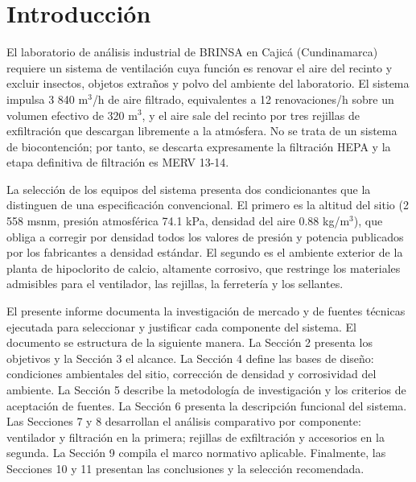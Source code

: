 \section{Introducción}

El laboratorio de análisis industrial de BRINSA en Cajicá (Cundinamarca) requiere un sistema de ventilación cuya función es renovar el aire del recinto y excluir insectos, objetos extraños y polvo del ambiente del laboratorio. El sistema impulsa 3 840 m$^3$/h de aire filtrado, equivalentes a 12 renovaciones/h sobre un volumen efectivo de 320 m$^3$, y el aire sale del recinto por tres rejillas de exfiltración que descargan libremente a la atmósfera. No se trata de un sistema de biocontención; por tanto, se descarta expresamente la filtración HEPA y la etapa definitiva de filtración es MERV 13-14.

La selección de los equipos del sistema presenta dos condicionantes que la distinguen de una especificación convencional. El primero es la altitud del sitio (2 558 msnm, presión atmosférica 74.1 kPa, densidad del aire 0.88 kg/m$^3$), que obliga a corregir por densidad todos los valores de presión y potencia publicados por los fabricantes a densidad estándar. El segundo es el ambiente exterior de la planta de hipoclorito de calcio, altamente corrosivo, que restringe los materiales admisibles para el ventilador, las rejillas, la ferretería y los sellantes.

El presente informe documenta la investigación de mercado y de fuentes técnicas ejecutada para seleccionar y justificar cada componente del sistema. El documento se estructura de la siguiente manera. La Sección 2 presenta los objetivos y la Sección 3 el alcance. La Sección 4 define las bases de diseño: condiciones ambientales del sitio, corrección de densidad y corrosividad del ambiente. La Sección 5 describe la metodología de investigación y los criterios de aceptación de fuentes. La Sección 6 presenta la descripción funcional del sistema. Las Secciones 7 y 8 desarrollan el análisis comparativo por componente: ventilador y filtración en la primera; rejillas de exfiltración y accesorios en la segunda. La Sección 9 compila el marco normativo aplicable. Finalmente, las Secciones 10 y 11 presentan las conclusiones y la selección recomendada.
